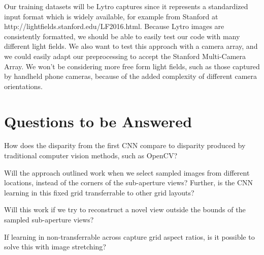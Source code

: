 \documentclass[10pt,twocolumn,letterpaper]{article}
\begin{document}
Our training datasets will be Lytro captures since it represents a standardized input format which is
widely available, for example from Stanford at http://lightfields.stanford.edu/LF2016.html.
Because Lytro images are consistently formatted, we should be able to easily test our code with many different
light fields. We also want to test this approach with a camera array, and we could easily adapt our preprocessing
to accept the Stanford Multi-Camera Array. We won't be considering more free form light fields, such as those
captured by handheld phone cameras, because of the added complexity of different camera orientations.

\section{Questions to be Answered}

How does the disparity from the first CNN compare to disparity produced 
by traditional computer vision methods, such as OpenCV?

Will the approach outlined work when we select sampled images from different locations, instead 
of the corners of the sub-aperture views? Further, is the CNN learning in this fixed grid transferrable
to other grid layouts?

Will this work if we try to reconstruct a novel view outside the bounds of the sampled sub-aperture views?

If learning in non-transferrable across capture grid aspect ratios, is it possible to solve this with
image stretching?

{\small


}
\end{document}
